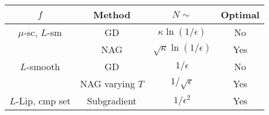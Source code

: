 \begin{tabular}{|c|c|c|c|}
	\hline
	$f$              & Method          & $N \sim$                         & Optimal \\ \hline
	$\mu$-sc, $L$-sm & GD              & $\kappa \ln (1/\epsilon)$        & No      \\
	                 & NAG             & $\sqrt{\kappa} \ln (1/\epsilon)$ & Yes     \\ \hline
	$L$-smooth       & GD              & $1/\epsilon$                     & No      \\
	                 & NAG varying $T$ & $1/\sqrt{\epsilon}$              & Yes     \\ \hline
	$L$-Lip, cmp set & Subgradient     & $1/\epsilon^2$                   & Yes     \\ \hline
\end{tabular}


